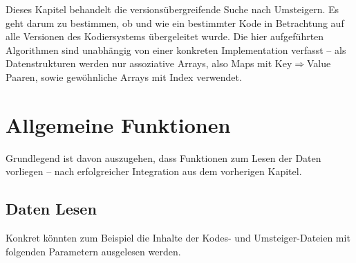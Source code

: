 Dieses Kapitel behandelt die versionsübergreifende Suche nach Umsteigern.
Es geht darum zu bestimmen, ob und wie ein bestimmter Kode in Betrachtung auf alle Versionen des Kodiersystems übergeleitet wurde. 
Die hier aufgeführten Algorithmen sind unabhängig von einer konkreten Implementation verfasst -- als Datenstrukturen werden nur assoziative Arrays, also Maps mit Key$\Rightarrow$Value Paaren, sowie gewöhnliche Arrays mit Index verwendet. 

\section{Allgemeine Funktionen}

Grundlegend ist davon auszugehen, dass Funktionen zum Lesen der Daten vorliegen -- nach erfolgreicher Integration aus dem vorherigen Kapitel. 

\subsection{Daten Lesen}
\label{function-read-data}

Konkret könnten zum Beispiel die Inhalte der Kodes- und Umsteiger-Dateien mit folgenden Parametern ausgelesen werden. 


